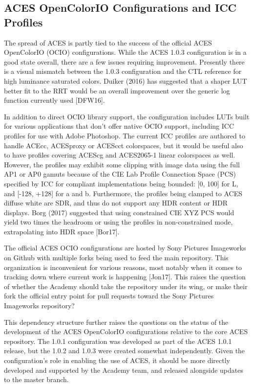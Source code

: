 \documentclass[conference]{IEEEtran}
\begin{document}
\subsection{ACES OpenColorIO Configurations and ICC Profiles}
The spread of ACES is partly tied to the success of the official ACES OpenColorIO (OCIO) configurations. While the ACES 1.0.3 configuration is in a good state overall, there are a few issues requiring improvement. Presently there is a visual mismatch between the 1.0.3 configuration and the CTL reference for high luminance saturated colors. Duiker (2016) has suggested that a shaper LUT better fit to the RRT would be an overall improvement over the generic log function currently used [DFW16].

In addition to direct OCIO library support, the configuration includes LUTs built for various applications that don’t offer native OCIO support, including ICC profiles for use with Adobe Photoshop. The current ICC profiles are authored to handle ACEcc, ACESproxy or ACEScct colorspaces, but it would be useful also to have profiles covering ACEScg and ACES2065-1 linear colorspaces as well. However, the profiles may exhibit some clipping with image data using the full AP1 or AP0 gamuts because of the CIE Lab Profile Connection Space (PCS) specified by ICC for compliant implementations being bounded: [0, 100] for L, and [-128, +128] for a and b. Furthermore, the profiles being clamped to ACES diffuse white are SDR, and thus do not support any HDR content or HDR displays. Borg (2017) suggested that using constrained CIE XYZ PCS would yield two times the headroom or using the profiles in non-constrained mode, extrapolating into HDR space [Bor17].

The official ACES OCIO configurations are hosted by Sony Pictures Imageworks on Github with multiple forks being used to feed the main repository. This organization is inconvenient for various reasons, most notably when it comes to tracking down where current work is happening [Jon17]. This raises the question of whether the Academy should take the repository under its wing, or make their fork the official entry point for pull requests toward the Sony Pictures Imageworks repository? 

This dependency structure further raises the questions on the status of the development of the ACES OpenColorIO configurations relative to the core ACES repository. The 1.0.1 configuration was developed as part of the ACES 1.0.1 release, but the 1.0.2 and 1.0.3 were created somewhat independently. Given the configuration's role in enabling the use of ACES, it should be more directly developed and supported by the Academy team, and released alongside updates to the master branch.
\end{document}

